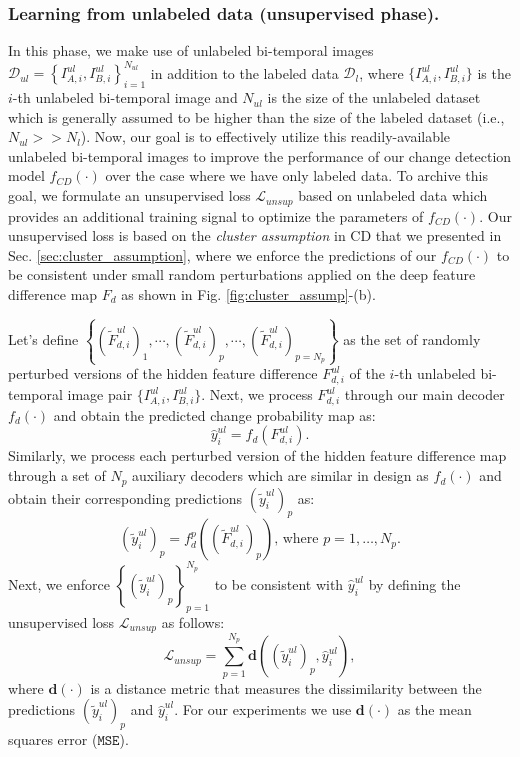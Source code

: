 \documentclass[runningheads]{llncs}
\begin{document}
\subsubsection{Learning from unlabeled data (unsupervised phase).} In this phase, we make use of unlabeled bi-temporal images $\mathcal{D}_{ul} = \left\{ I_{A,i}^{ul}, I_{B,i}^{ul} \right\}_{i=1}^{N_{ul}}$ in addition to the labeled data $\mathcal{D}_{l}$, where $\{ I_{A,i}^{ul}, I_{B,i}^{ul} \}$ is the $i$-th unlabeled bi-temporal image and $N_{ul}$ is the size of the unlabeled dataset which is generally assumed to be higher than the size of the labeled dataset (i.e., $N_{ul} >> N_l$). Now, our goal is to effectively utilize this readily-available unlabeled bi-temporal images to improve the performance of our change detection model $f_{CD}(\cdot)$ over the case where we have only labeled data. To archive this goal, we formulate an unsupervised loss $\mathcal{L}_{unsup}$ based on unlabeled data which provides an additional training signal to optimize the parameters of $f_{CD}(\cdot)$. Our unsupervised loss is based on the \textit{cluster assumption} in CD that we presented in Sec. \ref{sec:cluster_assumption}, where we enforce the predictions of our $f_{CD}(\cdot)$ to be consistent under small random perturbations applied on the deep feature difference map $F_d$ as shown in Fig. \ref{fig:cluster_assump}-(b).

Let's define  $\left\{ (\widetilde{F}_{d,i}^{ul})_{1}, \cdots, (\widetilde{F}_{d,i}^{ul})_{p}, \cdots, (\widetilde{F}_{d,i}^{ul})_{p=N_p} \right\}$ as the set of randomly perturbed versions of the hidden feature difference $F_{d,i}^{ul}$ of the $i$-th unlabeled bi-temporal image pair $\{I_{A,i}^{ul}, I_{B,i}^{ul}\}$. Next, we process $F_{d,i}^{ul}$ through our main decoder $f_d(\cdot)$ and obtain the predicted change probability map as:
\begin{equation}
    \hat{y}_i^{ul} = f_d\left(F_{d,i}^{ul}\right).
\end{equation}
Similarly, we process each perturbed version of the hidden feature difference map through a set of $N_p$ auxiliary decoders which are similar in design as $f_d(\cdot)$ and obtain their corresponding predictions $(\widetilde{y}_i^{ul})_p$ as:
\begin{equation}
    \left(\widetilde{y}_i^{ul}\right)_{p} = f_d^p\left( (\widetilde{F}_{d,i}^{ul})_{p} \right) \text{, where } p=1, \dots ,N_p.
\end{equation}
Next, we enforce $\left\{ \left(\widetilde{y}_i^{ul}\right)_{p} \right\}_{p=1}^{N_p}$ to be consistent with $\hat{y}_i^{ul}$ by defining the unsupervised loss $\mathcal{L}_{unsup}$  as follows:
\begin{equation}
    \mathcal{L}_{unsup} = \sum_{p=1}^{N_p} \mathbf{d} \left( \left(\widetilde{y}_i^{ul}\right)_{p}, \hat{y}_i^{ul} \right),
\end{equation}
where $\mathbf{d}(\cdot)$ is a distance metric that measures the dissimilarity between the predictions $\left(\widetilde{y}_i^{ul}\right)_{p}$ and $\hat{y}_i^{ul}$. For our experiments we use $\mathbf{d}(\cdot)$ as the mean squares error ($\texttt{MSE}$). 
\end{document}
